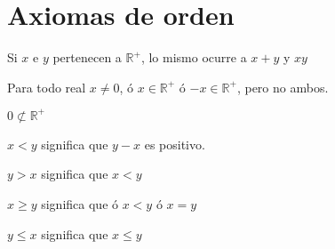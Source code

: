 \section{Axiomas de orden}
\begin{tcolorbox}[colback=white]
\begin{axioma}Si $x$ e $y$ pertenecen a $\mathbb{R}^+$, lo mismo ocurre a $x+y$ y $xy$\\
\end{axioma}
\begin{axioma}
Para todo real $x\neq 0$, ó $x \in \mathbb{R}^+$ ó $-x \in \mathbb{R}^+$, pero no ambos.\\
\end{axioma}
\begin{axioma}
$0 \not\subset \mathbb{R}^+$\\
\end{axioma}
\end{tcolorbox}

\begin{tcolorbox}[colback=white]
\begin{def.}
$x<y $ significa que $y-x$ es positivo. \\
\end{def.}
\begin{def.}
$y>x$ significa que $x<y$\\
\end{def.}
\begin{def.}
$x \geq y$ significa que ó $x<y$ ó $x=y$\\
\end{def.}
\begin{def.}
$y \leq x$ significa que $x \leq y$ 
\end{def.}
\end{tcolorbox}


